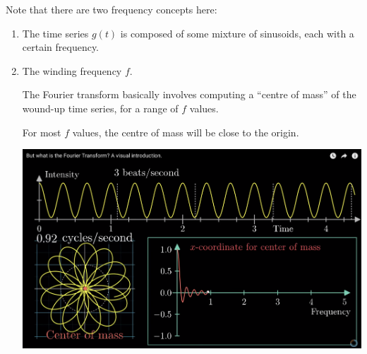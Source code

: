\begin{enumerate}
Note that there are two frequency concepts here:
\begin{enumerate}
\item The time series $g(t)$ is composed of some mixture of sinusoids, each with a certain frequency.
\item The winding frequency $f$.

  The Fourier transform basically involves computing a ``centre of mass'' of the wound-up time series, for a
  range of $f$ values.

For most $f$ values, the centre of mass will be close to the origin.
\begin{mdframed}
\includegraphics[width=400pt]{img/fourier--complex-exponentials-review--fourier-transform-eca1.png}
\end{mdframed}


\end{enumerate}
\end{enumerate}
